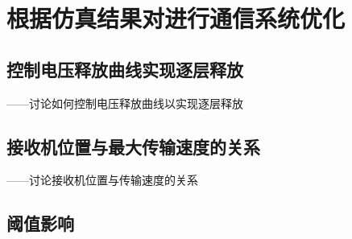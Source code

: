 \chapter{根据仿真结果对进行通信系统优化}

\section{控制电压释放曲线实现逐层释放}
——讨论如何控制电压释放曲线以实现逐层释放

\section{接收机位置与最大传输速度的关系}
——讨论接收机位置与传输速度的关系

\section{阈值影响}

